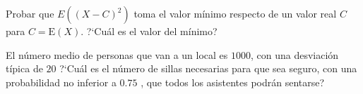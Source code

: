 \documentclass[12pt]{article}
\def\Z{Z\!\!\!Z}
\begin{document}
\probl Probar  que $E((X-C)^2)$ toma el valor mínimo respecto de un valor real $C$ para
 $C = \mathrm{E}(X).$ ?`Cuál es el valor del mínimo?



\probl  El número medio de personas que van a un local es $1000$, con una desviación típica
de $20$ ?`Cuál es el número de sillas necesarias para que sea seguro, con una probabilidad
no inferior a $0.75$ , que todos los asistentes podrán sentarse? 

\newpage
\end{document}
